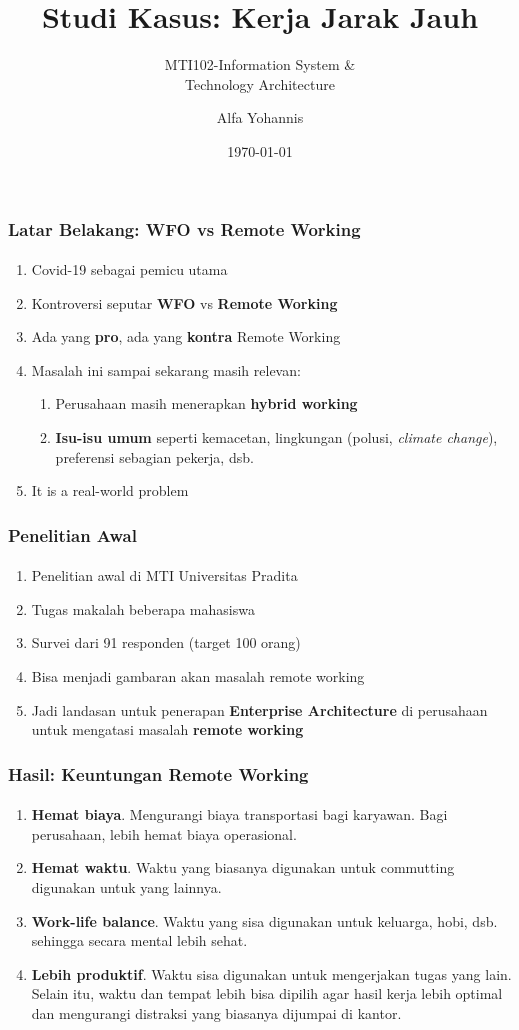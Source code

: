 \documentclass[aspectratio=169, table]{beamer}
\subtitle{MTI102-Information System \&\\Technology Architecture}
\title{Studi Kasus: Kerja Jarak Jauh}
\author{Alfa Yohannis}
\date{\today}
\begin{document}
	
	\frame{\titlepage}
	
	\begin{frame}
		\frametitle{Latar Belakang: WFO vs Remote Working}
		\framesubtitle{\hspace{1cm}}
		\begin{enumerate}
			\item Covid-19 sebagai pemicu utama
			\item Kontroversi seputar \textbf{WFO} vs \textbf{Remote Working}
			\item Ada yang \textbf{pro}, ada yang \textbf{kontra} Remote Working
			\item Masalah ini sampai sekarang masih relevan:
			\begin{enumerate}
				\item Perusahaan masih menerapkan \textbf{hybrid working}
				\item \textbf{Isu-isu umum} seperti kemacetan, lingkungan (polusi, \textit{climate change}), preferensi sebagian pekerja, dsb.
			\end{enumerate}
			\item It is a real-world problem
		\end{enumerate}
	\end{frame}
	
	\begin{frame}
		\frametitle{Penelitian Awal}
		\framesubtitle{\hspace{1cm}}
		\begin{enumerate}
			\item Penelitian awal di MTI Universitas Pradita
			\item Tugas makalah beberapa mahasiswa
			\item Survei dari  91 responden (target 100 orang)
			\item Bisa menjadi gambaran akan masalah remote working
			\item Jadi landasan untuk penerapan \textbf{Enterprise Architecture} di perusahaan untuk mengatasi masalah \textbf{remote working}
		\end{enumerate}
	\end{frame}
	
	\begin{frame}
		\frametitle{Hasil: Keuntungan Remote Working}
		\framesubtitle{\hspace{1cm}}
		\begin{enumerate}
			\item \textbf{Hemat biaya}. Mengurangi biaya transportasi bagi karyawan. Bagi perusahaan, lebih hemat biaya operasional.
			\item \textbf{Hemat waktu}. Waktu yang biasanya digunakan untuk commutting digunakan untuk yang lainnya.
			\item \textbf{Work-life balance}. Waktu yang sisa digunakan untuk keluarga, hobi, dsb. sehingga secara mental lebih sehat.
			\item \textbf{Lebih produktif}. Waktu sisa digunakan untuk mengerjakan tugas yang lain. Selain itu, waktu dan tempat lebih bisa dipilih agar hasil kerja lebih optimal dan mengurangi distraksi yang biasanya dijumpai di kantor.
		\end{enumerate}
	\end{frame}
	
\end{document}
